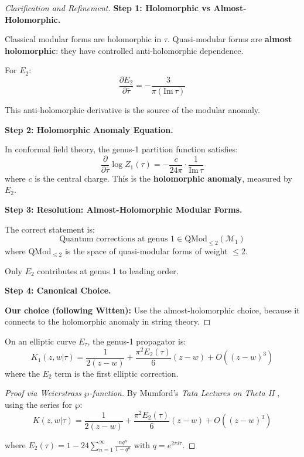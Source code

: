 \begin{proof}[Clarification and Refinement]

\textbf{Step 1: Holomorphic vs Almost-Holomorphic.}

Classical modular forms are holomorphic in $\tau$. Quasi-modular forms are 
\textbf{almost holomorphic}: they have controlled anti-holomorphic dependence.

For $E_2$:
$$\frac{\partial E_2}{\partial \bar{\tau}} = -\frac{3}{\pi (\text{Im}\,\tau)}$$

This anti-holomorphic derivative is the source of the modular anomaly.

\textbf{Step 2: Holomorphic Anomaly Equation.}

In conformal field theory, the genus-1 partition function satisfies:
$$\frac{\partial}{\partial \bar{\tau}} \log Z_1(\tau) = -\frac{c}{24\pi} \cdot 
\frac{1}{\text{Im}\,\tau}$$
where $c$ is the central charge. This is the \textbf{holomorphic anomaly}, measured by $E_2$.

\textbf{Step 3: Resolution: Almost-Holomorphic Modular Forms.}

The correct statement is:
$$\text{Quantum corrections at genus 1} \in \text{QMod}_{\leq 2}(\mathcal{M}_1)$$
where QMod$_{\leq 2}$ is the space of quasi-modular forms of weight $\leq 2$.

Only $E_2$ contributes at genus 1 to leading order.

\textbf{Step 4: Canonical Choice.}

\textbf{Our choice (following Witten):} Use the almost-holomorphic choice, 
because it connects to the holomorphic anomaly in string theory.

\end{proof}

\begin{lemma}\label{lem:elliptic-propagator}
On an elliptic curve $E_\tau$, the genus-1 propagator is:
$$K_1(z,w|\tau) = \frac{1}{2(z-w)} + \frac{\pi^2 E_2(\tau)}{6}(z-w) + O((z-w)^3)$$
where the $E_2$ term is the first elliptic correction.
\end{lemma}

\begin{proof}[Proof via Weierstrass $\wp$-function]
By Mumford's \emph{Tata Lectures on Theta II} \cite{Mumford84}, using the series for $\wp$:
$$K(z,w|\tau) = \frac{1}{2(z-w)} + \frac{\pi^2 E_2(\tau)}{6}(z-w) + O((z-w)^3)$$

where $E_2(\tau) = 1 - 24\sum_{n=1}^{\infty} \frac{nq^n}{1-q^n}$ with $q = e^{2\pi i \tau}$.
\end{proof}

